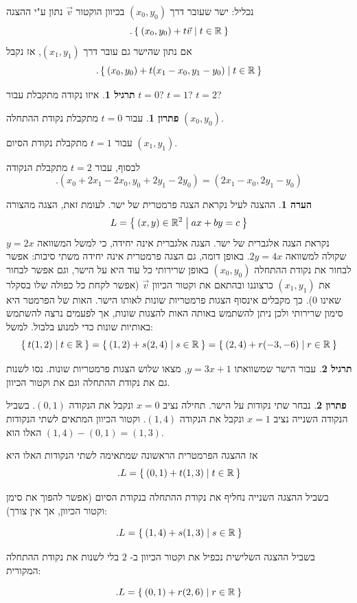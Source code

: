 \documentclass[12pt]{report}
\theoremstyle{plain}
\theoremstyle{definition}
\newtheorem{exercise}{תרגיל}[chapter]
\newtheorem{remark}{הערה}[chapter]
\newtheorem*{solution}{פתרון}
\newcommand{\R}{\mathbb{R}}
\newcommand{\0}{\mathbf{0}}
\begin{document}
נכליל: ישר שעובר דרך
$(x_0,y_0)$
בכיוון הוקטור
$\vec{v}$
נתון ע"י ההצגה
$$
.\Set{(x_0,y_0)+t\vec{v}|t\in\R}
$$
אם נתון שהישר גם עובר דרך
$(x_1,y_1)$,
אז נקבל
$$
.\Set{(x_0,y_0)+t(x_1-x_0,y_1-y_0)|t\in\R}
$$


\begin{exercise}
איזו נקודה מתקבלת עבור $t=0$? $t=1$? $t=2$?
\end{exercise}

\begin{solution}
עבור 
$t=0$
מתקבלת נקודת ההתחלה
$(x_0,y_0)$.

עבור 
$t=1$
מתקבלת נקודת הסיום
$(x_1,y_1)$.

לבסוף, עבור
$t=2$
מתקבלת הנקודה
$$
.(x_0+2x_1-2x_0,y_0+2y_1-2y_0)=(2x_1-x_0,2y_1-y_0)
$$
\end{solution}

\begin{remark}
ההצגה לעיל נקראת הצגה פרמטרית של ישר. לעומת זאת, הצגה מהצורה
$$
    L=\Set{(x,y)\in\R^2|ax+by=c}
$$
נקראת הצגה אלגברית של
ישר. הצגה אלגברית אינה יחידה, כי למשל המשוואה $y=2x$ שקולה למשוואה
$2y=4x$. באופן דומה, גם הצגה פרמטרית אינה יחידה משתי סיבות: אפשר
לבחור את נקודת ההתחלה $(x_0,y_0)$ באופן שרירותי כל עוד היא
על הישר, וגם אפשר לבחור את $(x_1,y_1)$ כרצוננו ובהתאם את
וקטור הכיוון $\vec{v}$ (אפשר לקחת כל כפולה שלו בסקלר שאינו 
$0$).
כך מקבלים אינסוף הצגות פרמטריות שונות לאותו הישר. האות של הפרמטר היא סימון שרירותי ולכן ניתן להשתמש באותה האות להצגות שונות, אך לפעמים נרצה להשתמש באותיות שונות כדי למנוע בלבול. למשל:
$$
	\Set{t(1,2)|t\in\R}=\Set{(1,2)+s(2,4)|s\in\R}=\Set{(2,4)+r(-3,-6)|r\in\R}
$$
\end{remark}

\begin{exercise}
עבור הישר שמשוואתו
$y=3x+1$,
מצאו שלוש הצגות פרמטריות שונות. נסו לשנות גם את נקודת ההתחלה וגם את וקטור הכיוון.
\end{exercise}

\begin{solution}

נבחר שתי נקודות על הישר. תחילה נציב
$x=0$
ונקבל את הנקודה
$(0,1)$.
בשביל הנקודה השנייה נציב
$x=1$
ונקבל את הנקודה
$(1,4)$.
וקטור הכיוון המתאים לשתי הנקודות האלו הוא
$(1,4)-(0,1)=(1,3)$.

אז ההצגה הפרמטרית הראשונה שמתאימה לשתי הנקודות האלו היא
$$
.L=\Set{(0,1)+t(1,3)|t\in\R}
$$

בשביל ההצגה השנייה נחליף את נקודת ההתחלה בנקודת הסיום (אפשר להפוך את סימן וקטור הכיוון, אך אין צורך):

$$
.L=\Set{(1,4)+s(1,3)|s\in\R}
$$

בשביל ההצגה השלישית נכפיל את וקטור הכיוון ב-
$2$
בלי לשנות את נקודת ההתחלה המקורית:

$$
.L=\Set{(0,1)+r(2,6)|r\in\R}
$$


\end{solution}
\end{document}
